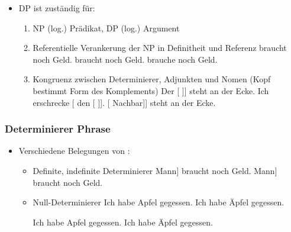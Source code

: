 \begin{frame}

\begin{itemize}
\item DP ist zuständig für:

	\begin{enumerate}
		\item NP \ras (log.) Prädikat, DP \ras (log.) Argument 
		\eal 
		\zl

\pause
	
		\item Referentielle Verankerung der NP in Definitheit und Referenz
		\eal
		\ex {} braucht noch Geld.
		\ex {} braucht noch Geld.
		\ex {} brauche noch Geld.
		\zl

\pause

		\item Kongruenz zwischen Determinierer, Adjunkten und Nomen (Kopf bestimmt Form des Komplements)
		\eal 
		\ex {[} Der [ ]{]} steht an der Ecke.
		\ex Ich erschrecke [ den [ ]].
		\ex {[}  [  Nachbar]{]} steht an der Ecke.
		\zl

	\end{enumerate}		

\end{itemize}			

\end{frame}


\begin{frame}
\frametitle{Determinierer Phrase}

\begin{itemize}
	\item Verschiedene Belegungen von :
	\begin{itemize}
		\item Definite, indefinite Determinierer
		\eal
		\ex {[}  Mann] braucht noch Geld.
		\ex {[}  Mann] braucht noch Geld.
		\zl

\pause		
		\item Null-Determinierer 
		\eal 
		\ex Ich habe  Apfel gegessen.
		\ex Ich habe  Äpfel gegessen.
		\zl			

\pause		
		\eal
		\ex Ich habe  Apfel gegessen.
		\ex Ich habe \alertred{$\emptyset$} Äpfel gegessen.
		\zl			
		
	\end{itemize}
\end{itemize}

\end{frame}



